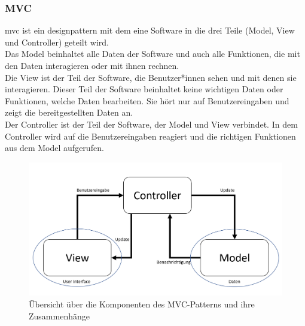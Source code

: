 \subsubsection{MVC}
\Gls{mvc} ist ein \Gls{designpattern} mit dem eine Software in die drei Teile (Model, View und Controller) geteilt wird\cite{mvc}.\\
Das Model beinhaltet alle Daten der Software und auch alle Funktionen, die mit den Daten interagieren oder mit ihnen rechnen.\\
Die View ist der Teil der Software, die Benutzer*innen sehen und mit denen sie interagieren. Dieser Teil der Software beinhaltet keine wichtigen Daten oder Funktionen, welche Daten bearbeiten. Sie hört nur auf Benutzereingaben und zeigt die bereitgestellten Daten an.\\
Der Controller ist der Teil der Software, der Model und View verbindet. In dem Controller wird auf die Benutzereingaben reagiert und die richtigen Funktionen aus dem Model aufgerufen.
\begin{figure}[H]
	\centering
	\includegraphics[width=0.8\linewidth]{images/mvc}
	\caption[Übersicht des MVC-Patterns]{Übersicht über die Komponenten des MVC-Patterns und ihre Zusammenhänge}
	\label{fig:mvc}
\end{figure}
